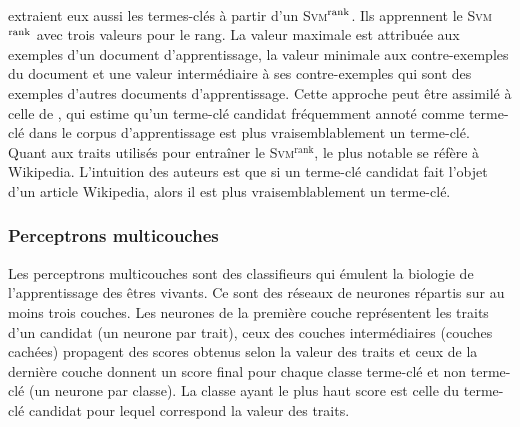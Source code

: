        ~\\ extraient eux aussi les termes-clés à
        partir d'un \textsc{Svm}$^\textnormal{rank}$. Ils apprennent le
        \textsc{Svm}$^\textnormal{rank}$ avec trois valeurs pour le rang. La
        valeur maximale est attribuée aux exemples d'un document
        d'apprentissage, la valeur minimale aux contre-exemples du document et
        une valeur intermédiaire à ses contre-exemples qui sont des exemples
        d'autres documents d'apprentissage. Cette approche peut être assimilé à
        celle de , qui estime qu'un terme-clé
        candidat fréquemment annoté comme terme-clé dans le corpus
        d'apprentissage est plus vraisemblablement un terme-clé. Quant aux
        traits utilisés pour entraîner le \textsc{Svm}$^\text{rank}$, le plus
        notable se réfère à Wikipedia. L'intuition des auteurs est que si un
        terme-clé candidat fait l'objet d'un article Wikipedia, alors il est
        plus vraisemblablement un terme-clé.

      \subsubsection{Perceptrons multicouches}
      \label{subsubsec:main-state_of_the_art-automatic_keyphrase_extraction-supervised_keyphrase_extraction-neural_network}
        Les perceptrons multicouches sont des classifieurs qui émulent la
        biologie de l'apprentissage des êtres vivants. Ce sont des réseaux de
        neurones répartis sur au moins trois couches. Les neurones de la
        première couche représentent les traits d'un candidat (un neurone par
        trait), ceux des couches intermédiaires (couches cachées) propagent des
        scores obtenus selon la valeur des traits et ceux de la dernière couche
        donnent un score final pour chaque classe \og{}terme-clé\fg{} et
        \og{}non terme-clé\fg{} (un neurone par classe). La classe ayant le plus
        haut score est celle du terme-clé candidat pour lequel correspond la
        valeur des traits.
        
